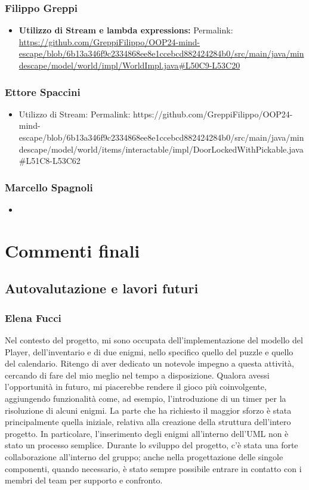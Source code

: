 \documentclass[a4paper,12pt]{report}
\begin{document}
\subsection{Filippo Greppi}
%
\begin{itemize}
	\item \textbf{Utilizzo di Stream e lambda expressions:} 
	Permalink: \url{https://github.com/GreppiFilippo/OOP24-mind-escape/blob/6b13a346f9c2334868ee8e1ccebcd882424284b0/src/main/java/mindescape/model/world/impl/WorldImpl.java#L50C9-L53C20}
\end{itemize}
%
\subsection{Ettore Spaccini}
%
\begin{itemize}
	\item Utilizzo di Stream:
	Permalink: https://github.com/GreppiFilippo/OOP24-mind-escape/blob/6b13a346f9c2334868ee8e1ccebcd882424284b0/src/main/java/mindescape/model/world/items/interactable/impl/DoorLockedWithPickable.java#L51C8-L53C62
\end{itemize}
%
\subsection{Marcello Spagnoli}
%
\begin{itemize}
	\item %
\end{itemize}
%
\chapter{Commenti finali}
%
\section{Autovalutazione e lavori futuri}
\subsection{Elena Fucci}
Nel contesto del progetto, mi sono occupata dell'implementazione del modello del Player, dell'inventario e di due enigmi, nello specifico quello del puzzle e quello del calendario. 
Ritengo di aver dedicato un notevole impegno a questa attività, cercando di fare del mio meglio nel tempo a disposizione. Qualora avessi l'opportunità in futuro, mi piacerebbe rendere il gioco più coinvolgente, aggiungendo funzionalità come, ad esempio, l'introduzione di un timer per la risoluzione di alcuni enigmi. 
La parte che ha richiesto il maggior sforzo è stata principalmente quella iniziale, relativa alla creazione della struttura dell'intero progetto. In particolare, l'inserimento degli enigmi all'interno dell'UML non è stato un processo semplice. Durante lo sviluppo del progetto, c'è stata una forte collaborazione all'interno del gruppo; anche nella progettazione delle singole componenti, quando necessario, è stato sempre possibile entrare in contatto con i membri del team per supporto e confronto.
\end{document}
